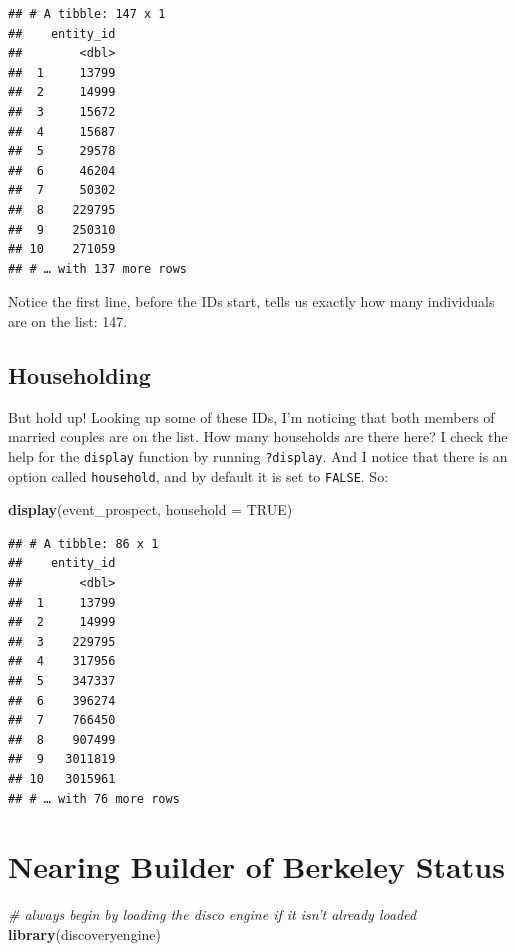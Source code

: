 \documentclass[]{book}
\newenvironment{Shaded}{\begin{snugshade}}{\end{snugshade}}
\newcommand{\CommentTok}[1]{\textcolor[rgb]{0.56,0.35,0.01}{\textit{#1}}}
\newcommand{\DataTypeTok}[1]{\textcolor[rgb]{0.13,0.29,0.53}{#1}}
\newcommand{\KeywordTok}[1]{\textcolor[rgb]{0.13,0.29,0.53}{\textbf{#1}}}
\newcommand{\NormalTok}[1]{#1}
\newcommand{\OtherTok}[1]{\textcolor[rgb]{0.56,0.35,0.01}{#1}}
\begin{document}
\begin{verbatim}
## # A tibble: 147 x 1
##    entity_id
##        <dbl>
##  1     13799
##  2     14999
##  3     15672
##  4     15687
##  5     29578
##  6     46204
##  7     50302
##  8    229795
##  9    250310
## 10    271059
## # … with 137 more rows
\end{verbatim}

Notice the first line, before the IDs start, tells us exactly how many individuals are on the list: 147.

\hypertarget{householding}{%
\section{Householding}\label{householding}}

But hold up! Looking up some of these IDs, I'm noticing that both members of married couples are on the list. How many households are there here? I check the help for the \texttt{display} function by running \texttt{?display}. And I notice that there is an option called \texttt{household}, and by default it is set to \texttt{FALSE}. So:

\begin{Shaded}
\begin{Highlighting}[]
\KeywordTok{display}\NormalTok{(event_prospect, }\DataTypeTok{household =} \OtherTok{TRUE}\NormalTok{)}
\end{Highlighting}
\end{Shaded}

\begin{verbatim}
## # A tibble: 86 x 1
##    entity_id
##        <dbl>
##  1     13799
##  2     14999
##  3    229795
##  4    317956
##  5    347337
##  6    396274
##  7    766450
##  8    907499
##  9   3011819
## 10   3015961
## # … with 76 more rows
\end{verbatim}

\hypertarget{ex-near-builder}{%
\chapter{Nearing Builder of Berkeley Status}\label{ex-near-builder}}

\begin{Shaded}
\begin{Highlighting}[]
\CommentTok{# always begin by loading the disco engine if it isn't already loaded}
\KeywordTok{library}\NormalTok{(discoveryengine)}
\end{Highlighting}
\end{Shaded}
\end{document}
